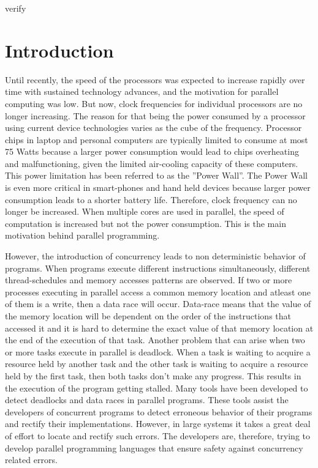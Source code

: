 verify \section{Introduction}

Until recently, the speed of the processors was expected to increase rapidly over time with sustained technology advances, and the motivation for parallel computing was low. But now, clock frequencies for individual processors are no longer increasing. The reason for that being the power consumed by a processor using current device technologies varies as the cube of the frequency. Processor chips in laptop and personal computers are typically limited to consume at most 75 Watts because a larger power consumption would lead to chips overheating and malfunctioning, given the limited air-cooling capacity of these computers. This power limitation has been referred to as the ''Power Wall''. The Power Wall is even more critical in smart-phones and hand held devices because larger power consumption leads to a shorter battery life. Therefore, clock frequency can no longer be increased. When multiple cores are used in parallel, the speed of computation is increased but not the power consumption. This is the main motivation behind parallel programming.

 However, the introduction of concurrency leads to non deterministic behavior of programs. When programs execute different instructions simultaneously, different thread-schedules and memory accesses patterns are observed. If two or more processes executing in parallel access a common memory location and atleast one of them is a write, then a data race will occur. Data-race means that the value of the memory location will be dependent on the order of the instructions that accessed it and it is hard to determine the exact value of that memory location at the end of the execution of that task. Another problem that can arise when two or more tasks execute in parallel is deadlock. When a task is waiting to acquire a resource held by another task and the other task is waiting to acquire a resource held by the first task, then both tasks don't make any progress. This results in the execution of the program getting stalled. Many tools have been developed to detect deadlocks and data races in parallel programs. These tools assist the developers of concurrent programs to detect erroneous behavior of their programs and rectify their implementations. However, in large systems it takes a great deal of effort to locate and rectify such errors. The developers are, therefore, trying to develop parallel programming languages that ensure safety against concurrency related errors. 
 
